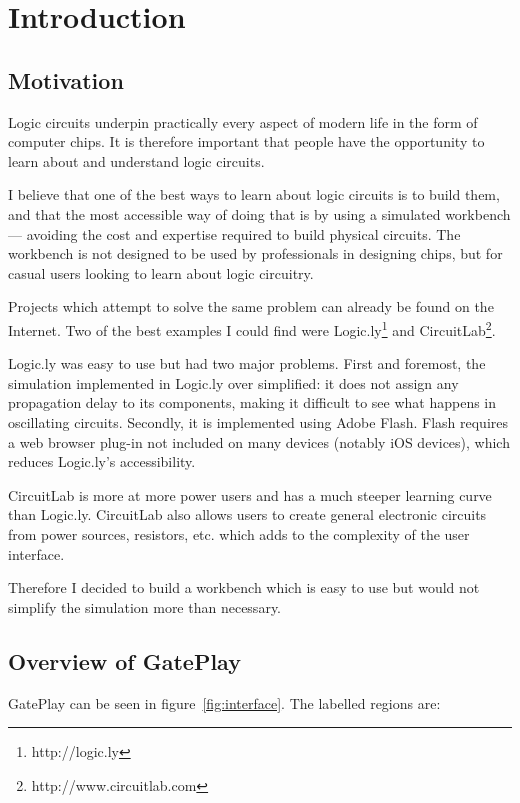 \chapter{Introduction}

\section{Motivation}
Logic circuits underpin practically every aspect of modern life in the form of computer chips. It is therefore important that people have the opportunity to learn about and understand logic circuits.

I believe that one of the best ways to learn about logic circuits is to build them, and that the most accessible way of doing that is by using a simulated workbench --- avoiding the cost and expertise required to build physical circuits. The workbench is not designed to be used by professionals in designing chips, but for casual users looking to learn about logic circuitry.

Projects which attempt to solve the same problem can already be found on the Internet. Two of the best examples I could find were Logic.ly\footnote{http://logic.ly} and CircuitLab\footnote{http://www.circuitlab.com}.

Logic.ly was easy to use but had two major problems. First and foremost, the simulation implemented in Logic.ly over simplified: it does not assign any propagation delay to its components, making it difficult to see what happens in oscillating circuits. Secondly, it is implemented using Adobe Flash. Flash requires a web browser plug-in not included on many devices (notably iOS devices), which reduces Logic.ly's accessibility.

CircuitLab is more at more power users and has a much steeper learning curve than Logic.ly. CircuitLab also allows users to create general electronic circuits from power sources, resistors, etc. which adds to the complexity of the user interface.

Therefore I decided to build a workbench which is easy to use but would not simplify the simulation more than necessary.

\section{Overview of GatePlay}
GatePlay can be seen in figure~\ref{fig:interface}. The labelled regions are:

